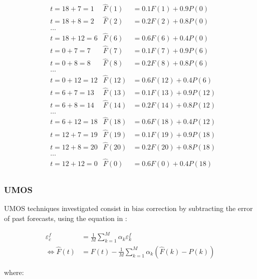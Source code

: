 \begin{align*}
    & t=18+7=1 & \hat{F}(1)  & = 0.1  F(1) +  0.9 P(0) \\
    & t=18+8=2 & \hat{F}(2)  & = 0.2  F(2) +  0.8 P(0) \\
    & \ldots & & \\
    & t=18+12=6 & \hat{F}(6) & = 0.6  F(6) +  0.4 P(0) \\
    & t=0+7=7   & \hat{F}(7)  & = 0.1  F(7) +  0.9 P(6) \\
    & t=0+8=8   & \hat{F}(8)  & = 0.2  F(8) +  0.8 P(6) \\
    & \ldots & &  \\
    & t=0+12=12 & \hat{F}(12) & = 0.6  F(12) +  0.4 P(6) \\
    & t=6+7=13  & \hat{F}(13)  & = 0.1  F(13) +  0.9 P(12) \\
    & t=6+8 =14 & \hat{F}(14)  & = 0.2  F(14) +  0.8 P(12) \\
    & \ldots & &   \\
    & t=6+12=18 & \hat{F}(18) & = 0.6  F(18) +  0.4 P(12) \\
    & t=12+7=19 & \hat{F}(19)  & = 0.1  F(19) +  0.9 P(18) \\
    & t=12+8=20 &\hat{F}(20)  & = 0.2  F(20) +  0.8 P(18) \\
    & \ldots & & \\
    & t=12+12=0 &\hat{F}(0) & = 0.6  F(0) +  0.4 P(18) \\
\end{align*}

\subsubsection{UMOS}

UMOS techniques investigated consist in bias correction by subtracting the error of past forecasts, using the equation in \cite{Stull2008}:

\begin{align}
    \varepsilon_c^f &= \frac{1}{M} \sum_{k=1}^M \alpha_k \varepsilon_k^f \label{eq:umos}\\
    \Leftrightarrow \hat{F}(t) &= F(t) - \frac{1}{M} \sum_{k=1}^M \alpha_k \left( \hat{F}(k)-P(k) \right)
\end{align}

where:

